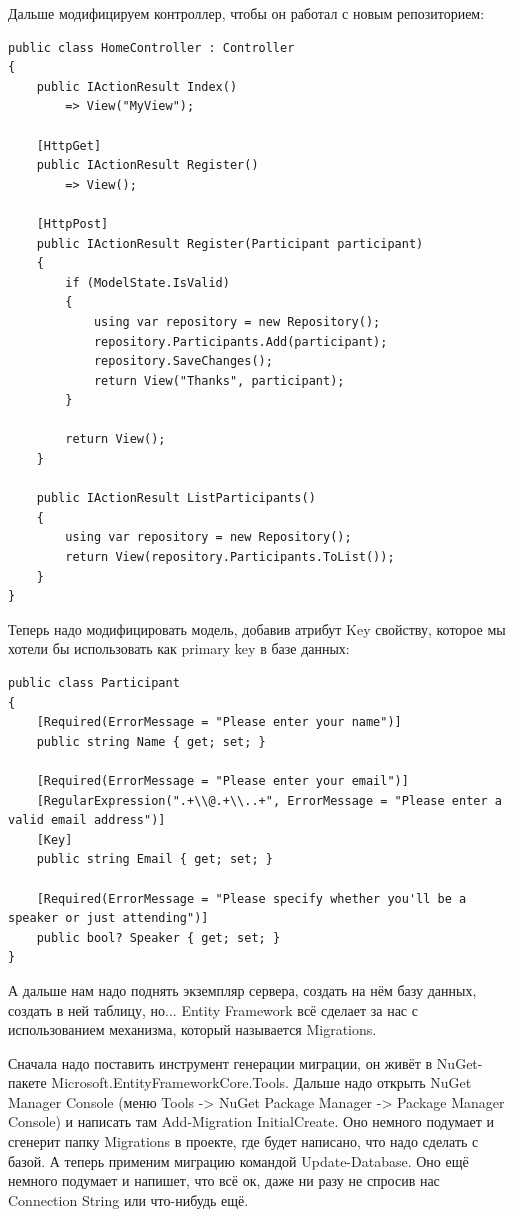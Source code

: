 \documentclass[a5paper]{article}
\begin{document}
Дальше модифицируем контроллер, чтобы он работал с новым репозиторием:

\begin{verbatim}
public class HomeController : Controller
{
    public IActionResult Index()
        => View("MyView");

    [HttpGet]
    public IActionResult Register()
        => View();

    [HttpPost]
    public IActionResult Register(Participant participant)
    {
        if (ModelState.IsValid)
        {
            using var repository = new Repository();
            repository.Participants.Add(participant);
            repository.SaveChanges();
            return View("Thanks", participant);
        }

        return View();
    }

    public IActionResult ListParticipants()
    {
        using var repository = new Repository();
        return View(repository.Participants.ToList());
    }
}
\end{verbatim}

Теперь надо модифицировать модель, добавив атрибут Key свойству, которое мы хотели бы использовать как primary key в базе данных:

\begin{verbatim}
public class Participant
{
    [Required(ErrorMessage = "Please enter your name")]
    public string Name { get; set; }

    [Required(ErrorMessage = "Please enter your email")]
    [RegularExpression(".+\\@.+\\..+", ErrorMessage = "Please enter a valid email address")]
    [Key]
    public string Email { get; set; }

    [Required(ErrorMessage = "Please specify whether you'll be a speaker or just attending")]
    public bool? Speaker { get; set; }
}
\end{verbatim}

А дальше нам надо поднять экземпляр сервера, создать на нём базу данных, создать в ней таблицу, но... Entity Framework всё сделает за нас с использованием механизма, который называется Migrations. 

Сначала надо поставить инструмент генерации миграции, он живёт в NuGet-пакете Microsoft.EntityFrameworkCore.Tools. Дальше надо открыть NuGet Manager Console (меню Tools -> NuGet Package Manager -> Package Manager Console) и
написать там Add-Migration InitialCreate. Оно немного подумает и сгенерит папку Migrations в проекте, где будет написано, что надо сделать с базой. А теперь применим миграцию командой Update-Database. Оно ещё немного подумает и напишет, что всё ок, даже ни разу не спросив нас Connection String 
или что-нибудь ещё.
\end{document}
